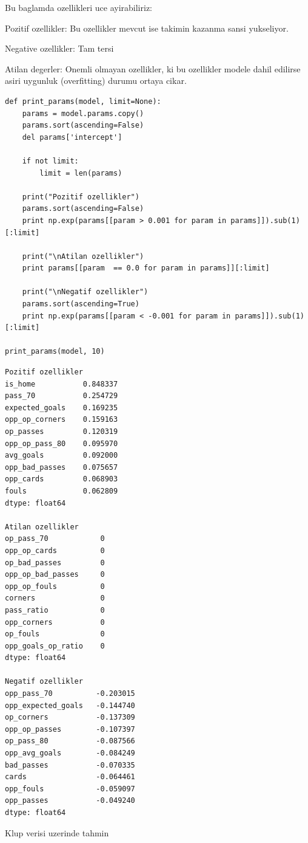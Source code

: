 \documentclass[12pt,fleqn]{article}\usepackage{../common}
\begin{document}
Bu baglamda ozellikleri uce ayirabiliriz:

Pozitif ozellikler: Bu ozellikler mevcut ise takimin kazanma sansi yukseliyor.

Negative ozellikler: Tam tersi

Atilan degerler: Onemli olmayan ozellikler, ki bu ozellikler modele dahil
edilirse asiri uygunluk (overfitting) durumu ortaya cikar. 

\begin{verbatim}
def print_params(model, limit=None):    
    params = model.params.copy()
    params.sort(ascending=False)
    del params['intercept']
    
    if not limit:
        limit = len(params)

    print("Pozitif ozellikler")
    params.sort(ascending=False)
    print np.exp(params[[param > 0.001 for param in params]]).sub(1)[:limit]

    print("\nAtilan ozellikler")
    print params[[param  == 0.0 for param in params]][:limit]

    print("\nNegatif ozellikler")
    params.sort(ascending=True)
    print np.exp(params[[param < -0.001 for param in params]]).sub(1)[:limit]

print_params(model, 10)
\end{verbatim}

\begin{verbatim}
Pozitif ozellikler
is_home           0.848337
pass_70           0.254729
expected_goals    0.169235
opp_op_corners    0.159163
op_passes         0.120319
opp_op_pass_80    0.095970
avg_goals         0.092000
opp_bad_passes    0.075657
opp_cards         0.068903
fouls             0.062809
dtype: float64

Atilan ozellikler
op_pass_70            0
opp_op_cards          0
op_bad_passes         0
opp_op_bad_passes     0
opp_op_fouls          0
corners               0
pass_ratio            0
opp_corners           0
op_fouls              0
opp_goals_op_ratio    0
dtype: float64

Negatif ozellikler
opp_pass_70          -0.203015
opp_expected_goals   -0.144740
op_corners           -0.137309
opp_op_passes        -0.107397
op_pass_80           -0.087566
opp_avg_goals        -0.084249
bad_passes           -0.070335
cards                -0.064461
opp_fouls            -0.059097
opp_passes           -0.049240
dtype: float64
\end{verbatim}

Klup verisi uzerinde tahmin
\end{document}
